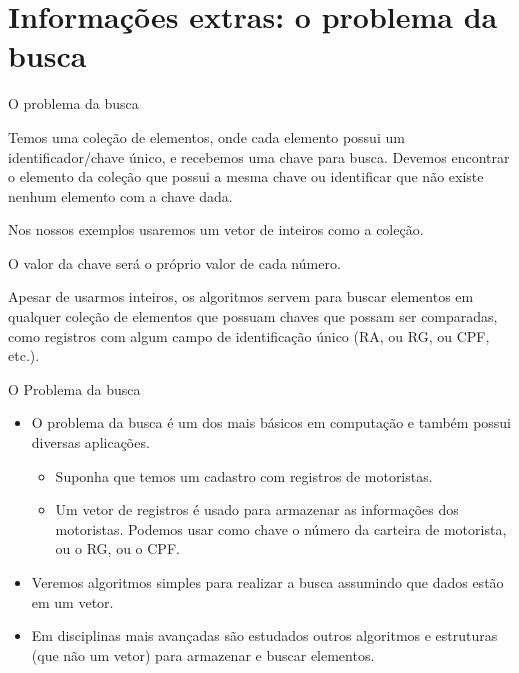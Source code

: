 \documentclass[handout]{beamer}
\begin{document}
\section{Informações extras: o problema da busca}

\begin{frame}[fragile]{O problema da busca}

    \begin{block}{}
        Temos uma coleção de elementos, onde cada elemento possui um identificador/chave único, e recebemos uma chave para busca.
        Devemos encontrar o elemento da coleção que possui a mesma chave ou identificar que não existe nenhum elemento com a chave dada.
    \end{block}

    Nos nossos exemplos usaremos um vetor de inteiros como a coleção.

    O valor da chave será o próprio valor de cada número.

    Apesar de usarmos inteiros, os algoritmos servem para buscar elementos em qualquer coleção de elementos que possuam chaves que possam ser comparadas, como registros com algum campo de identificação único (RA, ou RG, ou CPF, etc.).

\end{frame}

\begin{frame}[fragile]{O Problema da busca}

    \begin{itemize}
        \item O problema da busca é um dos mais básicos em computação e também possui diversas aplicações.
        \begin{itemize}
            \item Suponha que temos um cadastro com registros de motoristas.
            \item Um vetor de registros é usado para armazenar as informações dos motoristas. Podemos usar como chave o número da carteira de motorista, ou o RG, ou o CPF.
        \end{itemize}
        \item Veremos algoritmos simples para realizar a busca assumindo que dados estão em um vetor.
        \item Em disciplinas mais avançadas são estudados outros algoritmos e estruturas (que não um vetor) para armazenar e buscar elementos.
    \end{itemize}

\end{frame}
\end{document}
